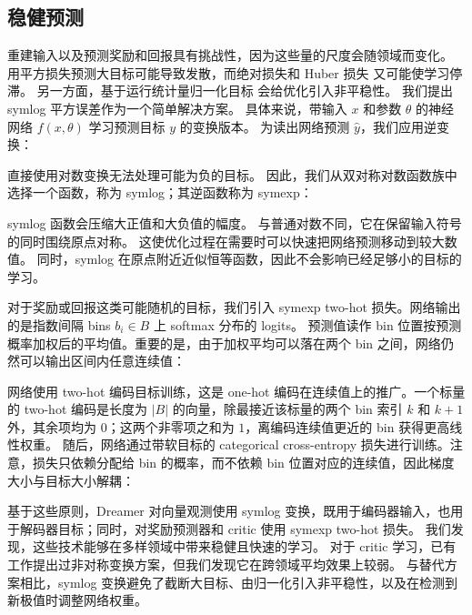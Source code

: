 \subsection*{稳健预测}
\label{sec:symlog}

重建输入以及预测奖励和回报具有挑战性，因为这些量的尺度会随领域而变化。
用平方损失预测大目标可能导致发散，而绝对损失和 Huber 损失\citep{mnih2015dqn} 又可能使学习停滞。
另一方面，基于运行统计量归一化目标\citep{schulman2017ppo} 会给优化引入非平稳性。
我们提出 symlog 平方误差作为一个简单解决方案。
具体来说，带输入 $x$ 和参数 $\theta$ 的神经网络 $f(x,\theta)$ 学习预测目标 $y$ 的变换版本。
为读出网络预测 $\hat{y}$，我们应用逆变换：


直接使用对数变换无法处理可能为负的目标。
因此，我们从双对称对数函数族中选择一个函数\citep{webber2012symlog}，称为 symlog；其逆函数称为 symexp：


symlog 函数会压缩大正值和大负值的幅度。
与普通对数不同，它在保留输入符号的同时围绕原点对称。
这使优化过程在需要时可以快速把网络预测移动到较大数值。
同时，symlog 在原点附近近似恒等函数，因此不会影响已经足够小的目标的学习。

对于奖励或回报这类可能随机的目标，我们引入 symexp two-hot 损失。网络输出的是指数间隔 bins $b_i \in B$ 上 softmax 分布的 logits。
预测值读作 bin 位置按预测概率加权后的平均值。重要的是，由于加权平均可以落在两个 bin 之间，网络仍然可以输出区间内任意连续值：


网络使用 two-hot 编码目标训练\citep{schrittwieser2019muzero,bellemare2017c51}，这是 one-hot 编码在连续值上的推广。一个标量的 two-hot 编码是长度为 $|B|$ 的向量，除最接近该标量的两个 bin 索引 $k$ 和 $k+1$ 外，其余项均为 $0$；这两个非零项之和为 $1$，离编码连续值更近的 bin 获得更高线性权重。
随后，网络通过带软目标的 categorical cross-entropy 损失进行训练。注意，损失只依赖分配给 bin 的概率，而不依赖 bin 位置对应的连续值，因此梯度大小与目标大小解耦：


基于这些原则，Dreamer 对向量观测使用 symlog 变换，既用于编码器输入，也用于解码器目标；同时，对奖励预测器和 critic 使用 symexp two-hot 损失。
我们发现，这些技术能够在多样领域中带来稳健且快速的学习。
对于 critic 学习，已有工作提出过非对称变换方案\citep{kapturowski2018r2d2}，但我们发现它在跨领域平均效果上较弱。
与替代方案相比，symlog 变换避免了截断大目标\citep{mnih2015dqn}、由归一化引入非平稳性\citep{schulman2017ppo}，以及在检测到新极值时调整网络权重\citep{hessel2019popart}。

